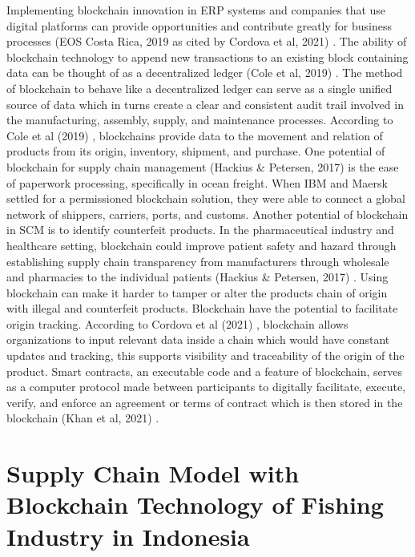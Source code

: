 Implementing blockchain innovation in ERP systems and companies that use digital platforms can  provide opportunities and contribute greatly for business processes (EOS Costa Rica, 2019 as cited by Cordova et al, 2021) \nocite{rrl-OBTSCM1}.  The ability of blockchain technology to append new transactions to an existing block containing data can be thought of as a decentralized ledger (Cole et al, 2019) \nocite{rrl-OBTSCM5}. The method of blockchain to behave like a decentralized ledger can serve as a single unified source of data which in turns create a clear and consistent audit trail involved in the manufacturing, assembly, supply, and maintenance processes. According to Cole et al (2019) \nocite{rrl-OBTSCM5}, blockchains provide data to the movement and relation of products from its origin, inventory, shipment, and purchase. One potential of blockchain for supply chain management (Hackius \& Petersen, 2017) \nocite{rrl-OBTSCM6} is the ease of paperwork processing, specifically in ocean freight. When IBM and Maersk settled for a permissioned blockchain solution, they were able to connect a global network of shippers, carriers, ports, and customs. Another potential of blockchain in SCM is to identify counterfeit products. In the pharmaceutical industry and healthcare setting, blockchain could improve patient safety and hazard through establishing supply chain transparency from manufacturers through wholesale and pharmacies to the individual patients (Hackius \& Petersen, 2017) \nocite{rrl-OBTSCM6}. Using blockchain can make it harder to tamper or alter the products chain of origin with illegal and counterfeit products. Blockchain have the potential to facilitate origin tracking. According to Cordova et al (2021) \nocite{rrl-OBTSCM1}, blockchain allows organizations to input relevant data inside a chain which would have constant updates and tracking, this supports visibility and traceability of the origin of the product. Smart contracts, an executable code and a feature of blockchain, serves as a computer protocol made between participants to digitally facilitate, execute, verify, and enforce an agreement or terms of contract which is then stored in the blockchain (Khan et al, 2021) \nocite{rrl-OBTSCM7}.

\section{Supply Chain Model with Blockchain Technology of Fishing Industry in Indonesia}

